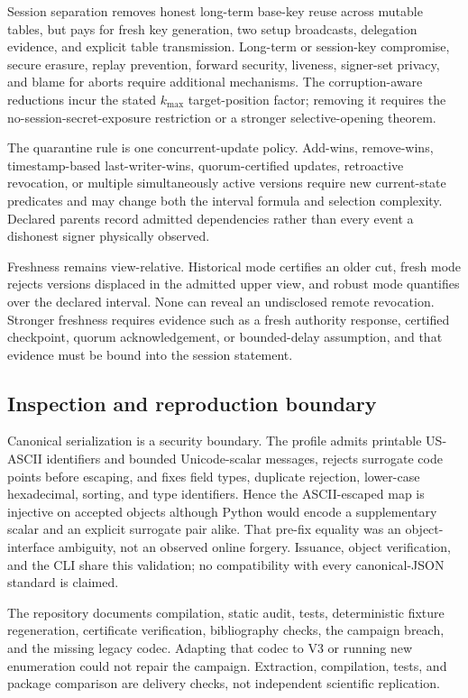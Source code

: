 \documentclass[11pt]{article}
\theoremstyle{definition}
\begin{document}
Session separation removes honest long-term base-key reuse across mutable tables, but pays for fresh key generation, two setup broadcasts, delegation evidence, and explicit table transmission.  Long-term or session-key compromise, secure erasure, replay prevention, forward security, liveness, signer-set privacy, and blame for aborts require additional mechanisms.  The corruption-aware reductions incur the stated $k_{\max}$ target-position factor; removing it requires the no-session-secret-exposure restriction or a stronger selective-opening theorem.

The quarantine rule is one concurrent-update policy.  Add-wins, remove-wins, timestamp-based last-writer-wins, quorum-certified updates, retroactive revocation, or multiple simultaneously active versions require new current-state predicates and may change both the interval formula and selection complexity.  Declared parents record admitted dependencies rather than every event a dishonest signer physically observed.

Freshness remains view-relative.  Historical mode certifies an older cut, fresh mode rejects versions displaced in the admitted upper view, and robust mode quantifies over the declared interval.  None can reveal an undisclosed remote revocation.  Stronger freshness requires evidence such as a fresh authority response, certified checkpoint, quorum acknowledgement, or bounded-delay assumption, and that evidence must be bound into the session statement.

\subsection{Inspection and reproduction boundary}
Canonical serialization is a security boundary.  The profile admits printable US-ASCII identifiers and bounded Unicode-scalar messages, rejects surrogate code points before escaping, and fixes field types, duplicate rejection, lower-case hexadecimal, sorting, and type identifiers.  Hence the ASCII-escaped map is injective on accepted objects although Python would encode a supplementary scalar and an explicit surrogate pair alike.  That pre-fix equality was an object-interface ambiguity, not an observed online forgery.  Issuance, object verification, and the CLI share this validation; no compatibility with every canonical-JSON standard is claimed.

The repository documents compilation, static audit, tests, deterministic fixture regeneration, certificate verification, bibliography checks, the campaign breach, and the missing legacy codec.  Adapting that codec to V3 or running new enumeration could not repair the campaign.  Extraction, compilation, tests, and package comparison are delivery checks, not independent scientific replication.
\end{document}
